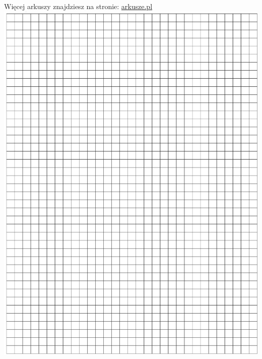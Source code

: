 \documentclass[10pt]{article}
\begin{document}
Więcej arkuszy znajdziesz na stronie: \href{http://arkusze.pl}{arkusze.pl}\\
\includegraphics[max width=\textwidth, center]{2024_11_21_f29375993e8c629c464fg-14}\\
\end{document}
